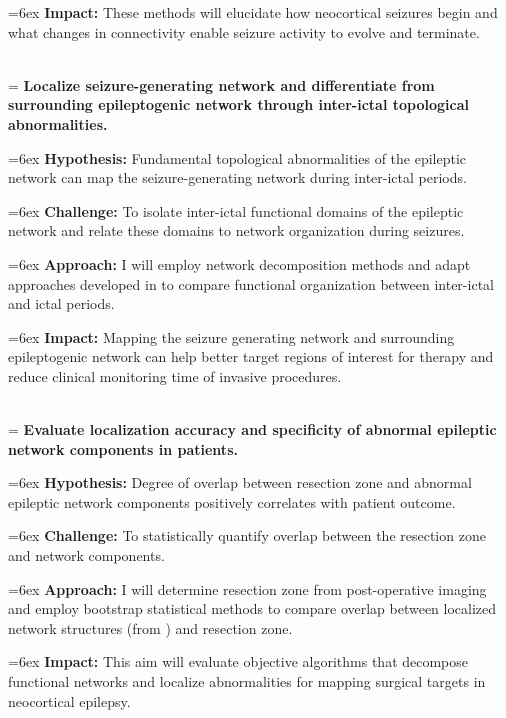 \hangindent=6ex
\textbf{Impact:} These methods will elucidate how neocortical seizures begin and what changes in connectivity enable seizure activity to evolve and terminate.

~\\
\hangindent=\parindent
{}
\noindent
{} \textbf{Localize seizure-generating network and differentiate from surrounding epileptogenic network through inter-ictal topological abnormalities.}

\hangindent=6ex
\textbf{Hypothesis:} Fundamental topological abnormalities of the epileptic network can map the seizure-generating network during inter-ictal periods.

\hangindent=6ex
\textbf{Challenge:} To isolate inter-ictal functional domains of the epileptic network and relate these domains to network organization during seizures.

\hangindent=6ex
\textbf{Approach:} I will employ network decomposition methods and adapt approaches developed in  to compare functional organization between inter-ictal and ictal periods.

\hangindent=6ex
\textbf{Impact:} Mapping the seizure generating network and surrounding epileptogenic network can help better target regions of interest for therapy and reduce clinical monitoring time of invasive procedures.

~\\
\hangindent=\parindent
{}
\noindent
{} \textbf{Evaluate localization accuracy and specificity of abnormal epileptic network components in patients.}

\hangindent=6ex
\textbf{Hypothesis:} Degree of overlap between resection zone and abnormal epileptic network components positively correlates with patient outcome.

\hangindent=6ex
\textbf{Challenge:} To statistically quantify overlap between the resection zone and network components.

\hangindent=6ex
\textbf{Approach:} I will determine resection zone from post-operative imaging and employ bootstrap statistical methods to compare overlap between localized network structures (from ) and resection zone.

\hangindent=6ex
\textbf{Impact:} This aim will evaluate objective algorithms that decompose functional networks and localize abnormalities for mapping surgical targets in neocortical epilepsy.
